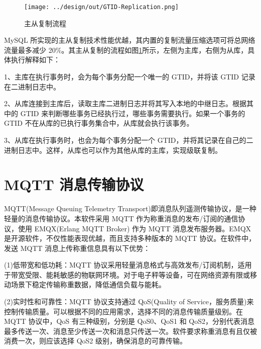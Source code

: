 \begin{figure}[H]
    \centering
    \texttt{[image: ../design/out/GTID-Replication.png]}
    \caption{主从复制流程}
    \label{fig:GTID-Replication}
\end{figure}

MySQL 所实现的主从复制技术性能优越，其内置的复制流量压缩选项可将总网络流量最多减少 20\%\cite{shehzad2020networkfootprintreplicationpopular}。其主从复制的流程如图\ref{fig:GTID-Replication}所示，左侧为主库，右侧为从库，具体执行解释如下：

1、主库在执行事务时，会为每个事务分配一个唯一的 GTID，并将该 GTID 记录在二进制日志中。

2、从库连接到主库后，读取主库二进制日志并将其写入本地的中继日志。根据其中的 GTID 来判断哪些事务已经执行过，哪些事务需要执行。如果一个事务的 GTID 不在从库的已执行事务集合中，从库就会执行该事务。

3、从库在执行事务时，也会为每个事务分配一个 GTID，并将其记录在自己的二进制日志中。这样，从库也可以作为其他从库的主库，实现级联复制\cite{MySQL-Liu2022}。

\section{MQTT 消息传输协议}\label{sec:mqtt}

MQTT(Message Queuing Telemetry Transport)即消息队列遥测传输协议，是一种轻量的消息传输协议。本软件采用 MQTT 作为称重消息的发布/订阅的通信协议，使用 EMQX(Erlang MQTT Broker) 作为 MQTT 消息发布服务器。EMQX 是开源软件，不仅性能表现优越，而且支持多种版本的 MQTT 协议\cite{dizdarevic2023engineeringexperimentallybenchmarkingopen}。在软件中，发送 MQTT 消息上传称重信息具有以下优势：

(1)低带宽和低功耗：MQTT 协议采用轻量消息格式与高效发布/订阅机制，适用于带宽受限、能耗敏感的物联网环境。对于电子秤等设备，可在网络资源有限或移动场景下稳定传输称重数据，降低通信负载与能耗\cite{Jia2015}。

(2)实时性和可靠性：MQTT 协议支持通过 QoS(Quality of Service，服务质量)来控制传输质量。可以根据不同的应用需求，选择不同的消息传输质量级别。在 MQTT 协议中，QoS 有三种级别\cite{Jia2015}，分别是 QoS0、QoS1 和 QoS2，分别代表消息最多传送一次、消息至少传送一次和消息只传送一次。软件要求称重消息有且仅被消费一次，则应该选择 QoS2 级别，确保消息的可靠传输。



